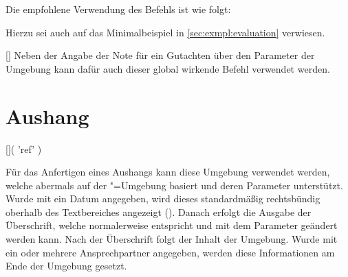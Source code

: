 \begin{Entity*}{}
%
\begin{Example}
Die empfohlene Verwendung des Befehls  ist wie folgt:
\begin{Code}[escapechar=§]
\end{Code}
Hierzu sei auch auf das Minimalbeispiel in \autoref{sec:exmpl:evaluation} 
verwiesen.%
%
\end{Example}

\begin{Declaration}{[]}
\printdeclarationlist%
%
Neben der Angabe der Note für ein Gutachten über den Parameter 
 der Umgebung  
kann dafür auch dieser global wirkende Befehl verwendet werden.
\end{Declaration}



\section{%
  Aushang%
}
\begin{Declaration}{[]}(%
  'ref'%
)
\begin{Declaration}{}
\printdeclarationlist%
%
Für das Anfertigen eines Aushangs kann diese Umgebung verwendet werden, welche
abermals auf der "=Umgebung basiert und deren Parameter 
unterstützt. Wurde mit  ein Datum angegeben, wird dieses 
standardmäßig rechtsbündig oberhalb des Textbereiches angezeigt 
(). Danach erfolgt die Ausgabe der 
Überschrift, welche normalerweise  entspricht und mit dem 
Parameter  geändert werden kann. Nach der 
Überschrift folgt der Inhalt der Umgebung. Wurde mit  ein 
oder mehrere Ansprechpartner angegeben, werden diese Informationen am Ende der 
Umgebung gesetzt.
\end{Declaration}
\end{Declaration}


\end{Entity*}
